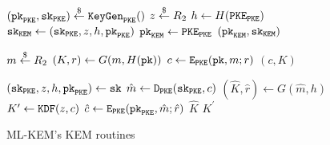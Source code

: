 \documentclass{article}
\begin{document}
\begin{figure}[H]
    \begin{minipage}{0.3\textwidth}
        \begin{algorithm}[H]
            \caption{$\keygen_\monospace{ML-KEM}$}\label{alg:mlkem-keygen}
            \begin{algorithmic}[1]
                \State $(\texttt{pk}_\texttt{PKE}, \texttt{sk}_\texttt{PKE}) \stackrel{\$}{\leftarrow} \texttt{KeyGen}_\texttt{PKE}()$
                \State $z \stackrel{\$}{\leftarrow} R_2$
                \State $h \leftarrow H(\texttt{PKE}_\texttt{PKE})$
                \State $\texttt{sk}_\texttt{KEM} \leftarrow (\texttt{sk}_\texttt{PKE}, z, h, \texttt{pk}_\texttt{PKE})$
                \State $\texttt{pk}_\texttt{KEM} \leftarrow \texttt{PKE}_\texttt{PKE}$
                \State \Return $(\texttt{pk}_\texttt{KEM}, \texttt{sk}_\texttt{KEM})$
            \end{algorithmic}
        \end{algorithm}
    \end{minipage}
    \hfill
    \begin{minipage}{0.33\textwidth}
        \begin{algorithm}[H]
            \caption{$\encap_\monospace{ML-KEM}(\pk_\kem)$}\label{alg:mlkem-encap}
            \begin{algorithmic}[1]
                \State $m \stackrel{\$}{\leftarrow} R_2$
                \State $(K, r) \leftarrow G(m, H(\texttt{pk}))$
                \State $c \leftarrow \texttt{E}_\texttt{PKE}(\texttt{pk}, m; r)$
                \State \Return $(c, K)$
            \end{algorithmic}
        \end{algorithm}
    \end{minipage}
    \hfill
    \begin{minipage}{0.33\textwidth}
        \begin{algorithm}[H]
            \caption{$\decap_\monospace{ML-KEM}(\sk, c)$}\label{alg:mlkem-decap}
            \begin{algorithmic}[1]
                \State $(\texttt{sk}_\texttt{PKE}, z, h, \texttt{pk}_\texttt{PKE}) \leftarrow \texttt{sk}$
                \State $\hat{m} \leftarrow \texttt{D}_\texttt{PKE}(\texttt{sk}_\texttt{PKE}, c)$
                \State $(\hat{K}, \hat{r}) \leftarrow G(\hat{m}, h)$
                \State $K^\prime \leftarrow \texttt{KDF}(z, c)$
                \State $\hat{c} \leftarrow \texttt{E}_\texttt{PKE}(\texttt{pk}_\texttt{PKE}, \hat{m}; \hat{r})$
                    \State \Return $\hat{K}$
                \Else
                    \State \Return $K^\prime$
                \EndIf
            \end{algorithmic}
        \end{algorithm}
    \end{minipage}
    \caption{ML-KEM's KEM routines}\label{fig:mlkem-kem-routines}
\end{figure}
\end{document}
